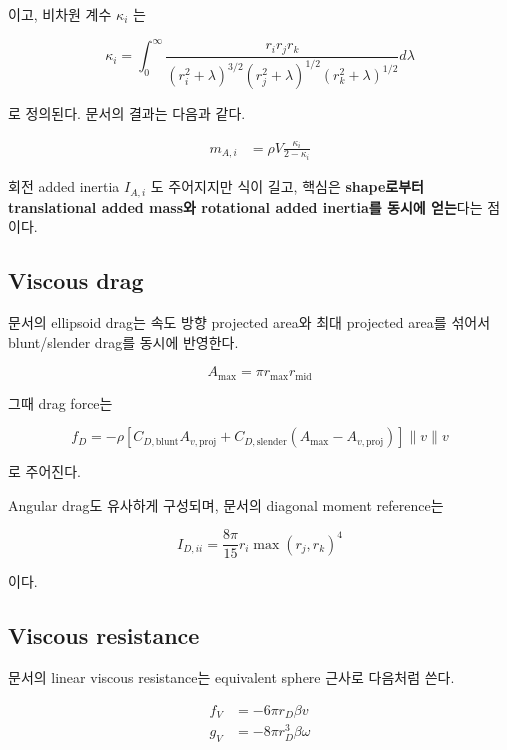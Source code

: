 \documentclass[11pt,a4paper]{article}
\begin{document}
이고, 비차원 계수 $\kappa_i$ 는

\begin{equation}
\kappa_i
=
\int_0^\infty
\frac{r_i r_j r_k}{
(r_i^2 + \lambda)^{3/2}(r_j^2+\lambda)^{1/2}(r_k^2+\lambda)^{1/2}
}
d\lambda
\end{equation}

로 정의된다. 문서의 결과는 다음과 같다.

\begin{align}
m_{A,i} &= \rho V \frac{\kappa_i}{2-\kappa_i}
\end{align}

회전 added inertia $I_{A,i}$ 도 주어지지만 식이 길고, 핵심은 \textbf{shape로부터 translational added mass와 rotational added inertia를 동시에 얻는}다는 점이다.

\subsection{Viscous drag}

문서의 ellipsoid drag는 속도 방향 projected area와 최대 projected area를 섞어서 blunt/slender drag를 동시에 반영한다.

\begin{equation}
A_{\max} = \pi r_{\max} r_{\text{mid}}
\end{equation}

그때 drag force는

\begin{equation}
f_D
=
-\rho
\left[
C_{D,\text{blunt}} A_{v,\text{proj}}
+
C_{D,\text{slender}}(A_{\max}-A_{v,\text{proj}})
\right]
\lVert v \rVert v
\end{equation}

로 주어진다.

Angular drag도 유사하게 구성되며, 문서의 diagonal moment reference는

\begin{equation}
I_{D,ii} = \frac{8\pi}{15} r_i \max(r_j, r_k)^4
\end{equation}

이다.

\subsection{Viscous resistance}

문서의 linear viscous resistance는 equivalent sphere 근사로 다음처럼 쓴다.

\begin{align}
f_V &= -6\pi r_D \beta v \\
g_V &= -8\pi r_D^3 \beta \omega
\end{align}
\end{document}
